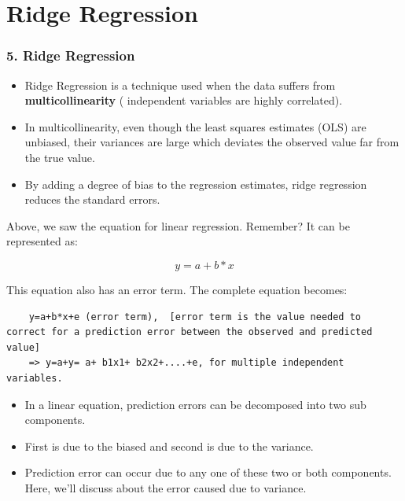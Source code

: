 \documentclass{beamer}
\begin{document}
\section{Ridge Regression}
\begin{frame}
\large
\frametitle{5. Ridge Regression}
	\begin{itemize}
	\item Ridge Regression is a technique used when the data suffers from \textbf{multicollinearity} ( independent variables are highly correlated).
	\item  In multicollinearity, even though the least squares estimates (OLS) are unbiased, their variances are large which deviates the observed value far from the true value.
	\item By adding a degree of bias to the regression estimates, ridge regression reduces the standard errors.
	\end{itemize}

\end{frame}
\begin{frame}[fragile]
	
	Above, we saw the equation for linear regression. Remember? It can be represented as:
	
\[	y=a+ b*x\]
	
	This equation also has an error term. The complete equation becomes:
	
	\begin{verbatim}
	y=a+b*x+e (error term),  [error term is the value needed to correct for a prediction error between the observed and predicted value]
	=> y=a+y= a+ b1x1+ b2x2+....+e, for multiple independent variables.
	\end{verbatim}

\end{frame}
\begin{frame}
	\begin{itemize}
		\item In a linear equation, prediction errors can be decomposed into two sub components. 
		\item First is due to the biased and second is due to the variance. 
		\item Prediction error can occur due to any one of these two or both components. Here, we’ll discuss about the error caused due to variance.
	\end{itemize}
\end{frame}
\end{document}
